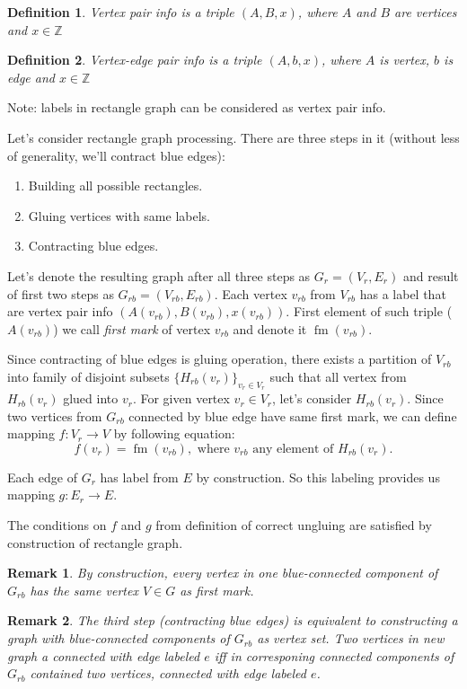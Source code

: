 \documentclass[12pt,a4paper,oneside]{article}
\newtheorem{definition}{Definition}
\newtheorem{remark}{Remark}
\begin{document}
\begin{definition}
  \emph{Vertex pair info} is a triple $(A, B, x)$, where $A$ and $B$ are vertices and $x \in \mathbb{Z}$ 
\end{definition}
\begin{definition}
  \emph{Vertex-edge pair info} is a triple $(A, b, x)$, where $A$ is vertex, $b$ is edge and $x \in \mathbb{Z}$ 
\end{definition}
Note: labels in rectangle graph can be considered as vertex pair info.

Let's consider rectangle graph processing. 
There are three steps in it (without less of generality, we'll contract blue edges):
\begin{enumerate}
\item Building all possible rectangles.
\item Gluing vertices with same labels.
\item Contracting blue edges.
\end{enumerate}
Let's denote the resulting graph after all three steps as $G_r = (V_r,E_r)$ and result of first two steps as $G_{rb} = (V_{rb}, E_{rb})$. Each vertex $v_{rb}$ from $V_{rb}$ has a label that are vertex pair info $(A(v_{rb}), B(v_{rb}), x(v_{rb}))$. First element of such triple ($A(v_{rb})$) we call \emph{first mark} of vertex $v_{rb}$ and denote it $\mathop{fm}(v_{rb})$. 

Since contracting of blue edges is gluing operation, there exists a partition of $V_{rb}$ into family of disjoint subsets $\{H_{rb}(v_r)\}_{v_r\in V_r}$ such that all vertex from $H_{rb}(v_r)$ glued into $v_r$. 
For given vertex $v_r \in V_r$, let's consider $H_{rb}(v_r)$. Since two vertices from $G_{rb}$ connected by blue edge have same first mark, we can define mapping $f: V_r\rightarrow V$ by following equation:
$$f(v_r)=\mathop{fm}(v_{rb}), \text{ where }v_{rb}\text{ any element of } H_{rb}(v_r).$$

Each edge of $G_{r}$ has label from $E$ by construction. So this labeling provides us mapping $g:E_{r}\rightarrow E$. 

The conditions on $f$ and $g$ from definition of correct ungluing are satisfied by construction of rectangle graph.

\begin{remark}
  By construction, every vertex in one blue-connected component of $G_{rb}$ has the same vertex $V \in G$ as first mark.
\end{remark}

\begin{remark}
 The third step (contracting blue edges) is equivalent to constructing a graph with blue-connected components of $G_{rb}$ as vertex set. Two vertices in new graph a connected with edge labeled $e$ iff in corresponing connected components of $G_{rb}$ contained two vertices, connected with edge labeled $e$.  
\end{remark}
\end{document}
